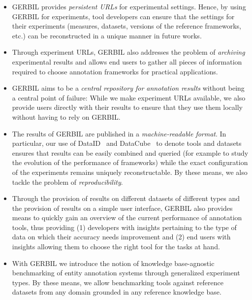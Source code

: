 \begin{itemize}
\item GERBIL provides \emph{persistent URLs} for experimental settings. Hence, by using GERBIL for experiments, tool developers can ensure that the settings for their experiments (measures, datasets, versions of the reference frameworks, etc.) can be reconstructed in a  unique manner in future works. 
\item Through experiment URLs, GERBIL also addresses the problem of \emph{archiving} experimental results and allows end users to gather all pieces of information required to choose annotation frameworks for practical applications.
\item GERBIL aims to be a \emph{central repository for annotation results} without being a central point of failure: While we make experiment URLs available, we also provide users directly with their results to ensure that they use them locally without having to rely on GERBIL.
\item The results of GERBIL are published in a \emph{machine-readable format}. In particular, our use of DataID~\cite{dataID} and DataCube~\cite{datacube} to denote tools and datasets ensures that results can be easily combined and queried (for example to study the evolution of the performance of frameworks) while the exact configuration of the experiments remains uniquely reconstructable. By these means, we also tackle the problem of \emph{reproducibility}. 
\item Through the provision of results on different datasets of different types and the provision of results on a simple user interface, GERBIL also provides means to quickly gain an overview of the current performance of annotation tools, thus providing (1) developers with insights pertaining to the type of data on which their accuracy needs improvement and (2) end users with insights allowing them to choose the right tool for the tasks at hand.
\item With GERBIL we introduce the notion of knowledge base-agnostic benchmarking of entity annotation systems through generalized experiment types. By these means, we allow benchmarking tools against reference datasets from any domain grounded in any reference knowledge base. 
\end{itemize}


